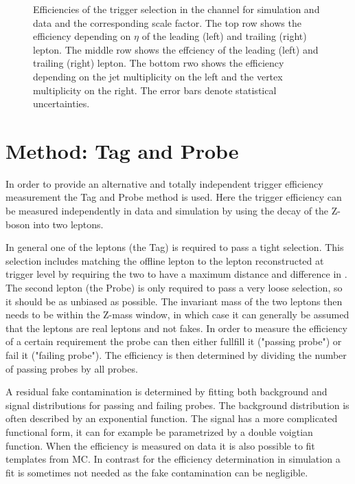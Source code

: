 \begin{figure}[htbp!]
\begin{center}
      \caption{Efficiencies of the trigger selection in the \emu channel for simulation and data and the corresponding scale factor. The top row shows the efficiency depending on $\eta$ of the leading (left) and trailing (right) lepton. The middle row shows the effciency \pt of the leading (left) and trailing (right) lepton. The bottom rwo shows the efficiency depending on the jet multiplicity on the left and the vertex multiplicity on the right.
      The error bars denote statistical uncertainties. }  
      
    \label{fig:MET_emu}
  \end{center}
\end{figure}


\section{Method: Tag and Probe}  %
\label{sec:TriggerTPMethod}

In order to provide an alternative and totally independent trigger efficiency measurement the Tag and Probe method is used.
Here the trigger efficiency can be measured independently in data and simulation by using the decay of the Z-boson into two leptons.

In general one of the leptons (the Tag) is required to pass a tight selection. This selection includes matching the offline lepton to the lepton reconstructed at trigger level by requiring the two to have a maximum distance and difference in \pt. The second lepton (the Probe) is only required to pass a very loose selection, so it should be as unbiased as possible. The invariant mass of the two leptons then needs to be within the Z-mass window, in which case it can generally be assumed that the leptons are real leptons and not fakes.
In order to measure the efficiency of a certain requirement the probe can then either fullfill it ("passing probe") or fail it ("failing probe"). The efficiency is then determined by dividing the number of passing probes by all probes.

A residual fake contamination is determined by fitting both background and signal distributions for passing and failing probes. The background distribution is often described by an exponential function. The signal has a more complicated functional form, it can for example be parametrized by a double voigtian function. When the efficiency is measured on data it is also possible to fit templates from MC.
In contrast for the efficiency determination in simulation a fit is sometimes not needed as the fake contamination can be negligible.

